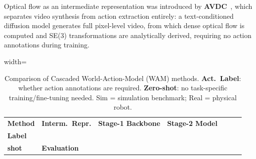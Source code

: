 Optical flow as an intermediate representation was introduced by \textbf{AVDC}~\cite{ko2024avdc}, which separates video synthesis from action extraction entirely: a text-conditioned diffusion model generates full pixel-level video, from which dense optical flow is computed and SE(3) transformations are analytically derived, requiring no action annotations during training.

\newcommand{\yes}{$\checkmark$}
\newcommand{\no}{$\times$}



\begin{table}[!t] 
\centering
\scriptsize
\setlength{\tabcolsep}{3.5pt}
\renewcommand{\arraystretch}{1.08}
\caption{Comparison of Cascaded World-Action-Model (WAM) methods. \textbf{Act.\ Label}: whether action annotations are required. \textbf{Zero-shot}: no task-specific training/fine-tuning needed. Sim = simulation benchmark; Real = physical robot.}
\label{tab:cascaded_wam}

\begin{adjustbox}{width=\linewidth}
\begin{threeparttable}
\begin{tabular}{
  l
  >{\RaggedRight\arraybackslash}p{2.20cm}
  >{\RaggedRight\arraybackslash}p{3.50cm}
  >{\RaggedRight\arraybackslash}p{3.60cm}
  l
  l
  >{\RaggedRight\arraybackslash}p{5.80cm}
}
\toprule
\textbf{Method} &
\textbf{Interm.\ Repr.} &
\textbf{Stage-1 Backbone} &
\textbf{Stage-2 Model} &
\makecell{\textbf{Act.}\\\textbf{Label}} &
\makecell{\textbf{Zero-}\\\textbf{shot}} &
\textbf{Evaluation} \\
\midrule


\end{tabular}
\end{threeparttable}
\end{adjustbox}
\end{table}
